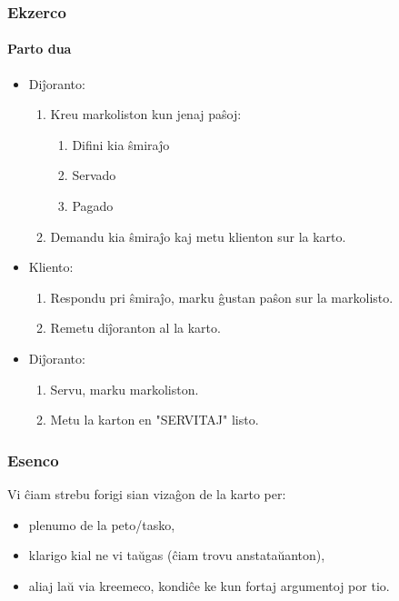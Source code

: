   \begin{frame}
    \frametitle{Ekzerco}
    \framesubtitle{Parto dua}

	\begin{itemize}
			
		\item Diĵoranto:
		\begin{enumerate}
			\item Kreu markoliston kun jenaj paŝoj:
				\begin{enumerate}
					\item Difini kia ŝmiraĵo
					\item Servado
					\item Pagado
				\end{enumerate}
				
			\item Demandu kia ŝmiraĵo kaj metu klienton sur la karto.
		\end{enumerate}
				
    
		\item Kliento:
		\begin{enumerate}
			\item Respondu pri ŝmiraĵo, marku ĝustan paŝon sur la markolisto.
			\item Remetu diĵoranton al la karto.
		\end{enumerate}    
		
		\item Diĵoranto:
		\begin{enumerate}
			\item Servu, marku markoliston.
			\item Metu la karton en "SERVITAJ" listo.
		\end{enumerate}    
			
	\end{itemize}		
	
    
  \end{frame}


  \begin{frame}
    \frametitle{Esenco}
    
	Vi ĉiam strebu \alert{forigi sian vizaĝon de la karto} per:
    
    \begin{itemize}
    	\item plenumo de la peto/tasko,
    	\item klarigo kial ne vi taŭgas (ĉiam trovu anstataŭanton),
    	\item aliaj laŭ via kreemeco, kondiĉe ke kun \alert{fortaj argumentoj} por tio.
    \end{itemize}
    
  \end{frame}

